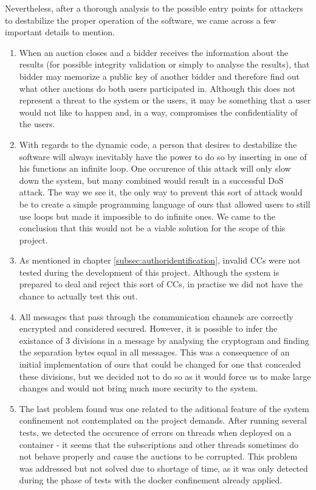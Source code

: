\documentclass[a4paper]{article}
\begin{document}
Nevertheless, after a thorough analysis to the possible entry points for attackers to destabilize the proper operation of the software, we came across a few important details to mention.
\begin{enumerate}
\item When an auction closes and a bidder receives the information about the results (for possible integrity validation or simply to analyse the results), that bidder may memorize a public key of another bidder and therefore find out what other auctions do both users participated in. Although this does not represent a threat to the system or the users, it may be something that a user would not like to happen and, in a way, compromises the confidentiality of the users.
\item With regards to the dynamic code, a person that desires to destabilize the software will always inevitably have the power to do so by inserting in one of his functions an infinite loop. One occurence of this attack will only slow down the system, but many combined would result in a successful DoS attack. The way we see it, the only way to prevent this sort of attack would be to create a simple programming language of ours that allowed users to still use loops but made it impossible to do infinite ones. We came to the conclusion that this would not be a viable solution for the scope of this project.
\item As mentioned in chapter \ref{subsec:authoridentification}, invalid CCs were not tested during the development of this project. Although the system is prepared to deal and reject this sort of CCs, in practise we did not have the chance to actually test this out.
\item All messages that pass through the communication channels are correctly encrypted and considered secured. However, it is possible to infer the existance of 3 divisions in a message by analysing the cryptogram and finding the separation bytes equal in all messages. This was a consequence of an initial implementation of ours that could be changed for one that concealed these divisions, but we decided not to do so as it would force us to make large changes and would not bring much more security to the system.
\item The last problem found was one related to the aditional feature of the system confinement not contemplated on the project demands. After running several tests, we detected the occurence of errors on threads when deployed on a container - it seems that the subscriptions and other threads sometimes do not behave properly and cause the auctions to be corrupted. This problem was addressed but not solved due to shortage of time, as it was only detected during the phase of tests with the docker confinement already applied.
\end{enumerate}
\end{document}
